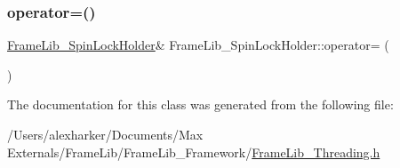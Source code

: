 \subsubsection{\texorpdfstring{operator=()}{operator=()}}
{\footnotesize\ttfamily \hyperlink{class_frame_lib___spin_lock_holder}{Frame\+Lib\+\_\+\+Spin\+Lock\+Holder}\& Frame\+Lib\+\_\+\+Spin\+Lock\+Holder\+::operator= (\begin{DoxyParamCaption}\item[{const \hyperlink{class_frame_lib___spin_lock_holder}{Frame\+Lib\+\_\+\+Spin\+Lock\+Holder} \&}]{ }\end{DoxyParamCaption})\hspace{0.3cm}{\ttfamily [delete]}}



The documentation for this class was generated from the following file\+:\begin{DoxyCompactItemize}
\item 
/\+Users/alexharker/\+Documents/\+Max Externals/\+Frame\+Lib/\+Frame\+Lib\+\_\+\+Framework/\hyperlink{_frame_lib___threading_8h}{Frame\+Lib\+\_\+\+Threading.\+h}\end{DoxyCompactItemize}
